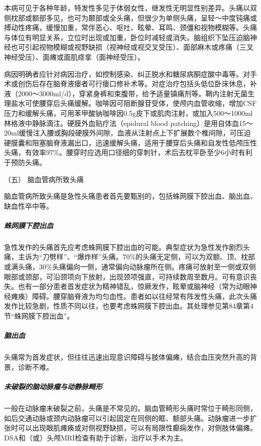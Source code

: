 本病可见于各种年龄，特发性多见于体弱女性，继发性无明显性别差异。头痛以双侧枕部或额部多见，也可为颞部或全头痛，但很少为单侧头痛，呈轻～中度钝痛或搏动性疼痛，缓慢加重，常伴恶心、呕吐、眩晕、耳鸣、颈僵和视物模糊等。头痛与体位有明显关系，立位时出现或加重，卧位时减轻或消失。脑组织下坠压迫脑神经也可引起视物模糊或视野缺损（视神经或视交叉受压）、面部麻木或疼痛（三叉神经受压）、面瘫或面肌痉挛（面神经受压）。

病因明确者应针对病因治疗，如控制感染、纠正脱水和糖尿病酮症酸中毒等。对手术或创伤后存在脑脊液瘘者可行瘘口修补术等。对症治疗包括头低位卧床休息，补液（2000～3000ml/d），穿紧身裤和束腹带，给予适量镇痛剂等。鞘内注射无菌生理盐水可使腰穿后头痛缓解。咖啡因可阻断腺苷受体，使颅内血管收缩，增加CSF压力和缓解头痛，可用苯甲酸钠咖啡因0.5g皮下或肌肉注射，或加入500～1000ml林格液中静脉滴注。硬膜外血贴疗法（epidural
blood
patching）是用自体血15～20ml缓慢注入腰或胸段硬膜外间隙，血液从注射点上下扩展数个椎间隙，可压迫硬膜囊和阻塞脑脊液漏出口，迅速缓解头痛，适用于腰穿后头痛和自发性低颅压性头痛，有效率97\%。腰穿时应选用口径细的穿刺针，术后去枕平卧至少6小时有利于预防头痛。

\hypertarget{text00020.htmlux5cux23CHP1-7-4-5}{}
（五） 脑血管病所致头痛

脑血管病所致头痛是急性头痛患者首先要甄别的，包括蛛网膜下腔出血、脑出血、缺血性卒中等。

\subparagraph{蛛网膜下腔出血}

急性发作的头痛首先应考虑蛛网膜下腔出血的可能。典型症状为急性发作剧烈头痛，主诉为“刀劈样”、“爆炸样”头痛。70\%的头痛无定侧，可以为双额、顶、枕部或满头痛，30\%头痛偏向一侧，通常偏向动脉瘤所在侧。疼痛可放射至一侧或双侧眼部或颈部，可沿颈项向下放射，出现颈项强直，可持续数周至数月。可有意识丧失。也有一部分患者首发症状为精神错乱，惊厥发作，眩晕或脑神经（常为动眼神经瘫痪）障碍。腰穿脑脊液为均匀血性。患者如以往经常有阵发性头痛，此次头痛发作比较急剧，性质不同以往，也要考虑蛛网膜下腔出血。其处理参见第84章第4节“蛛网膜下腔出血”。

\subparagraph{脑出血}

头痛常为首发症状，但往往迅速出现意识障碍与肢体偏瘫，结合血压突然升高的背景，诊断不难。

\subparagraph{未破裂的脑动脉瘤与动静脉畸形}

一般在动脉瘤未破裂之前，头痛是不常见的。脑血管畸形头痛时常位于畸形同侧，如后交通动脉或颈内动脉瘤可以引起固定在同侧的眶、额部头痛。动脉瘤进一步扩张时可以出现眼肌瘫痪或对侧视野缺损，可以有局限性癫痫发作，对侧肢体偏瘫。DSA和（或）头颅MRI检查有助于诊断，治疗以手术为主。

